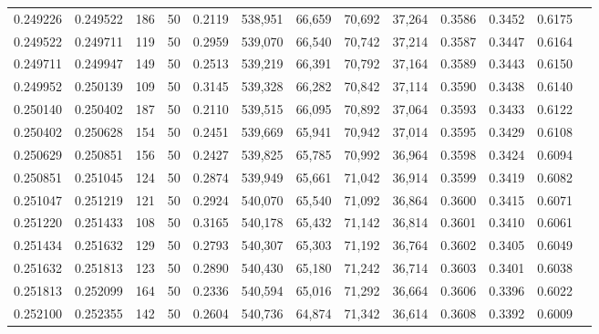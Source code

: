 \begin{tabular}{rrrrrrrrrrrrr}
0.249226 & 0.249522 &   186 &  50 &                                     0.2119 & 538,951 &  66,659 &  70,692 &  37,264 & 0.3586 & 0.3452 & 0.6175 \\
0.249522 & 0.249711 &   119 &  50 &                                     0.2959 & 539,070 &  66,540 &  70,742 &  37,214 & 0.3587 & 0.3447 & 0.6164 \\
0.249711 & 0.249947 &   149 &  50 &                                     0.2513 & 539,219 &  66,391 &  70,792 &  37,164 & 0.3589 & 0.3443 & 0.6150 \\
0.249952 & 0.250139 &   109 &  50 &                                     0.3145 & 539,328 &  66,282 &  70,842 &  37,114 & 0.3590 & 0.3438 & 0.6140 \\
0.250140 & 0.250402 &   187 &  50 &                                     0.2110 & 539,515 &  66,095 &  70,892 &  37,064 & 0.3593 & 0.3433 & 0.6122 \\
0.250402 & 0.250628 &   154 &  50 &                                     0.2451 & 539,669 &  65,941 &  70,942 &  37,014 & 0.3595 & 0.3429 & 0.6108 \\
0.250629 & 0.250851 &   156 &  50 &                                     0.2427 & 539,825 &  65,785 &  70,992 &  36,964 & 0.3598 & 0.3424 & 0.6094 \\
0.250851 & 0.251045 &   124 &  50 &                                     0.2874 & 539,949 &  65,661 &  71,042 &  36,914 & 0.3599 & 0.3419 & 0.6082 \\
0.251047 & 0.251219 &   121 &  50 &                                     0.2924 & 540,070 &  65,540 &  71,092 &  36,864 & 0.3600 & 0.3415 & 0.6071 \\
0.251220 & 0.251433 &   108 &  50 &                                     0.3165 & 540,178 &  65,432 &  71,142 &  36,814 & 0.3601 & 0.3410 & 0.6061 \\
0.251434 & 0.251632 &   129 &  50 &                                     0.2793 & 540,307 &  65,303 &  71,192 &  36,764 & 0.3602 & 0.3405 & 0.6049 \\
0.251632 & 0.251813 &   123 &  50 &                                     0.2890 & 540,430 &  65,180 &  71,242 &  36,714 & 0.3603 & 0.3401 & 0.6038 \\
0.251813 & 0.252099 &   164 &  50 &                                     0.2336 & 540,594 &  65,016 &  71,292 &  36,664 & 0.3606 & 0.3396 & 0.6022 \\
0.252100 & 0.252355 &   142 &  50 &                                     0.2604 & 540,736 &  64,874 &  71,342 &  36,614 & 0.3608 & 0.3392 & 0.6009 \\

\end{tabular}
